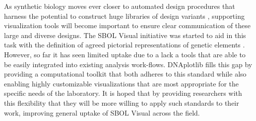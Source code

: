 \documentclass{bioinfo}
\begin{document}
As synthetic biology moves ever closer to automated design procedures that harness the potential to construct huge libraries of design variants \citep{Smanski14a,Bilitchenko11a}, supporting visualization tools will become important to ensure clear communication of these large and diverse designs. The SBOL Visual initiative was started to aid in this task with the definition of agreed pictorial representations of genetic elements \citep{Quinn13a}. However, so far it has seen limited uptake due to a lack a tools that are able to be easily integrated into existing analysis work-flows. DNAplotlib fills this gap by providing a computational toolkit that both adheres to this standard while also enabling highly customizable visualizations that are most appropriate for the specific needs of the laboratory. It is hoped that by providing researchers with this flexibility that they will be more willing to apply such standards to their work, improving general uptake of SBOL Visual across the field.
\end{document}
